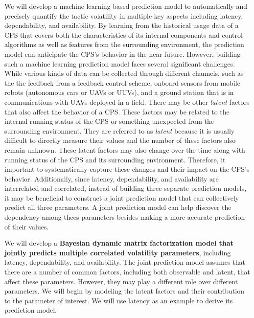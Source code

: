 \documentclass[11pt]{proposalnsf}
\newlength\q %
\begin{document}
\begin{sloppypar}
We will develop a machine learning based prediction model to automatically and precisely quantify the tactic volatility in multiple key aspects including latency, dependability, and availability. By learning from the historical usage data of a CPS that covers both the characteristics of its internal components and control algorithms as well as features from the surrounding environment, the prediction model can anticipate the CPS's behavior in the near future. However, building such a machine learning prediction model faces several significant challenges. While various kinds of data can be collected through different channels, such as the the feedback from a feedback control scheme, onboard sensors from mobile robots (autonomous cars or UAVs or UUVs), and a ground station that is in communications with UAVs deployed in a field. There may be other {\em latent} factors that also affect the behavior of a CPS. These factors may be related to the internal running status of the CPS or something unexpected from the surrounding environment. They are referred to as {\em latent} because it is usually difficult to directly measure their values and the number of these factors also remain unknown. These latent factors may also change over the time along with running status of the CPS and its surrounding environment. Therefore, it important to systematically capture these changes and their impact on the CPS's behavior. Additionally, since latency, dependability, and availability are interrelated and correlated, instead of building three separate prediction models, it may be beneficial to construct a joint prediction model that can collectively predict all three parameters. A joint prediction model can help discover the dependency among thees parameters besides making a more accurate prediction of their values. 

We will develop a {\bf Bayesian dynamic matrix factorization model that jointly predicts multiple correlated volatility parameters}, including latency, dependability, and availability. The joint prediction model assumes that there are a number of common factors, including both observable and latent, that affect these parameters. However, they may play a different role over different parameters. We will begin by modeling the latent factors and their contribution to the parameter of interest. We will use latency as an example to derive its prediction model.  


\end{sloppypar}
\end{document}
